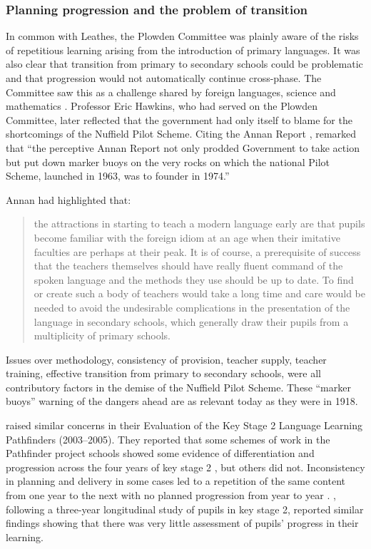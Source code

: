 \documentclass[output=paper]{langscibook}
\begin{document}
\subsubsection{Planning progression and the problem of transition}

In common with Leathes, the Plowden Committee was plainly aware of the risks of repetitious learning arising from the introduction of primary languages. It was also clear that transition from primary to secondary schools could be problematic and that progression would not automatically continue cross-phase. The Committee saw this as a challenge shared by foreign languages, science and mathematics \citep[446]{Plowden1967}. Professor Eric Hawkins, who had served on the Plowden Committee, later reflected that the government had only itself to blame for the shortcomings of the Nuffield Pilot Scheme. Citing the Annan Report \citep{Annan1962}, \citet{Hawkins1996} remarked that ``the perceptive Annan Report not only prodded Government to take action but put down marker buoys on the very rocks on which the national Pilot Scheme, launched in 1963, was to founder in 1974.''

Annan had highlighted that: 

\begin{quote}
the attractions in starting to teach a modern language early are that pupils become familiar with the foreign idiom at an age when their imitative faculties are perhaps at their peak. It is of course, a prerequisite of success that the teachers themselves should have really fluent command of the spoken language and the methods they use should be up to date. To find or create such a body of teachers would take a long time and care would be needed to avoid the undesirable complications in the presentation of the language in secondary schools, which generally draw their pupils from a multiplicity of primary schools. \citep[para 63]{Annan1962}
\end{quote}

Issues over methodology, consistency of provision, teacher supply, teacher training, effective transition from primary to secondary schools, were all contributory factors in the demise of the Nuffield Pilot Scheme. These ``marker buoys'' warning of the dangers ahead are as relevant today as they were in 1918.

\citet{MuijsEtAl2005} raised similar concerns in their Evaluation of the Key Stage 2 Language Learning Pathfinders (2003--2005). They reported that some schemes of work in the Pathfinder project schools showed some evidence of differentiation and progression across the four years of key stage 2 , but others did not. Inconsistency in planning and delivery in some cases led to a repetition of the same content from one year to the next with no planned progression from year to year \citep{MuijsEtAl2005}. \citet{CableEtAl2010}, following a three-year longitudinal study of pupils in key stage 2, reported similar findings showing that there was very little assessment of pupils’ progress in their learning.
\end{document}
